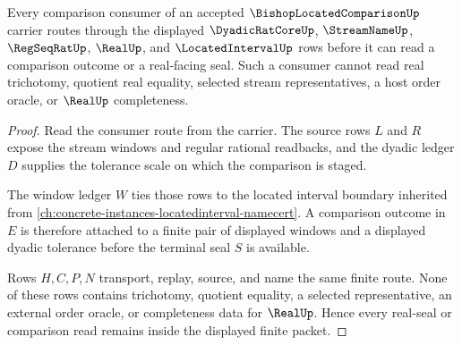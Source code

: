 \begin{theorem}
\label{thm:bishop-located-comparison-real-seal-nonescape}
Every comparison consumer of an accepted $\BishopLocatedComparisonUp$ carrier routes through the displayed $\DyadicRatCoreUp$, $\StreamNameUp$, $\RegSeqRatUp$, $\RealUp$, and $\LocatedIntervalUp$ rows before it can read a comparison outcome or a real-facing seal. Such a consumer cannot read real trichotomy, quotient real equality, selected stream representatives, a host order oracle, or $\RealUp$ completeness.
\end{theorem}
\begin{proof}
Read the consumer route from the carrier. The source rows $L$ and $R$ expose the stream windows and regular rational readbacks, and the dyadic ledger $D$ supplies the tolerance scale on which the comparison is staged.

The window ledger $W$ ties those rows to the located interval boundary inherited from \autoref{ch:concrete-instances-locatedinterval-namecert}. A comparison outcome in $E$ is therefore attached to a finite pair of displayed windows and a displayed dyadic tolerance before the terminal seal $S$ is available.

Rows $H,C,P,N$ transport, replay, source, and name the same finite route. None of these rows contains trichotomy, quotient equality, a selected representative, an external order oracle, or completeness data for $\RealUp$. Hence every real-seal or comparison read remains inside the displayed finite packet.
\end{proof}




